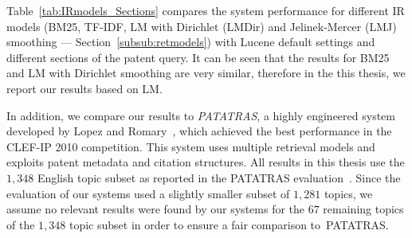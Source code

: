 Table~\ref{tab:IRmodels_Sections} compares the system performance for different IR models 
(BM25, TF-IDF, LM with Dirichlet (LMDir) and Jelinek-Mercer (LMJ) smoothing --- Section~\ref{subsub:retmodels}) with Lucene default settings and different sections of the patent query.
It can be seen that the results for BM25 and LM with Dirichlet smoothing are very similar, therefore in the this thesis, we report our results based on LM.    

In addition, we compare our results to \textit{PATATRAS}, a highly engineered system developed by Lopez and Romary~\cite{lopez2010experiments}, 
which achieved the best performance in the CLEF-IP 2010 competition. This system uses multiple retrieval models %
and exploits patent metadata and citation structures.  All results in this thesis use the $1, 348$ English topic subset as reported in the PATATRAS evaluation~\citep{piroi2010clef}.  Since the evaluation of our systems used a slightly smaller subset of $1, 281$ topics, we assume no relevant results were found by our systems for the $67$ remaining topics of the $1, 348$ topic subset in order to ensure a fair comparison to~PATATRAS.


% 


